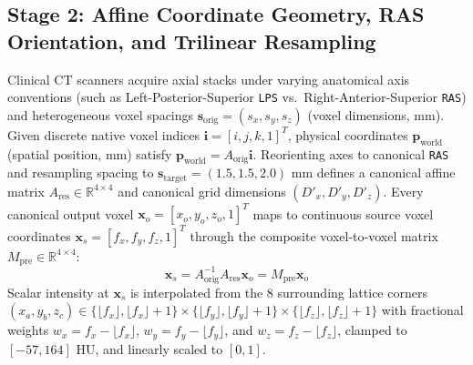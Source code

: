 \documentclass[10pt,twocolumn]{article}
\begin{document}
\subsection{Stage 2: Affine Coordinate Geometry, RAS Orientation, and Trilinear Resampling}
Clinical CT scanners acquire axial stacks under varying anatomical axis conventions (such as Left-Posterior-Superior \texttt{LPS} vs.\ Right-Anterior-Superior \texttt{RAS}) and heterogeneous voxel spacings $\mathbf{s}_{\text{orig}} = (s_x, s_y, s_z)$ (voxel dimensions, $\text{mm}$). Given discrete native voxel indices $\mathbf{i} = [i, j, k, 1]^T$, physical coordinates $\mathbf{p}_{\text{world}}$ (spatial position, $\text{mm}$) satisfy $\mathbf{p}_{\text{world}} = A_{\text{orig}} \mathbf{i}$. Reorienting axes to canonical \texttt{RAS} and resampling spacing to $\mathbf{s}_{\text{target}} = (1.5, 1.5, 2.0)\text{ mm}$ defines a canonical affine matrix $A_{\text{res}} \in \mathbb{R}^{4 \times 4}$ and canonical grid dimensions $(D'_x, D'_y, D'_z)$. Every canonical output voxel $\mathbf{x}_o = [x_o, y_o, z_o, 1]^T$ maps to continuous source voxel coordinates $\mathbf{x}_s = [f_x, f_y, f_z, 1]^T$ through the composite voxel-to-voxel matrix $M_{\text{pre}} \in \mathbb{R}^{4 \times 4}$:
\begin{equation}
    \mathbf{x}_s = A_{\text{orig}}^{-1} A_{\text{res}} \mathbf{x}_o = M_{\text{pre}} \mathbf{x}_o
    \label{eq:affine_composition}
\end{equation}
Scalar intensity at $\mathbf{x}_s$ is interpolated from the 8 surrounding lattice corners $(x_a, y_b, z_c) \in \{\lfloor f_x \rfloor, \lfloor f_x \rfloor + 1\} \times \{\lfloor f_y \rfloor, \lfloor f_y \rfloor + 1\} \times \{\lfloor f_z \rfloor, \lfloor f_z \rfloor + 1\}$ with fractional weights $w_x = f_x - \lfloor f_x \rfloor$, $w_y = f_y - \lfloor f_y \rfloor$, and $w_z = f_z - \lfloor f_z \rfloor$, clamped to $[-57, 164]\text{ HU}$, and linearly scaled to $[0, 1]$.
\end{document}
